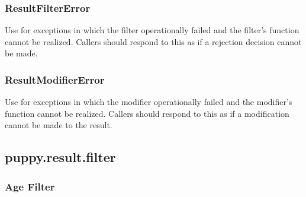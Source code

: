 \documentclass[letterpaper,10pt,english]{sphinxmanual}
\begin{document}
\subsubsection{ResultFilterError}
\label{api3.0:resultfiltererror}

\begin{fulllineitems}
\label{api3.0:puppy.result.exceptions.ResultFilterError}
Use for exceptions in which the filter operationally failed and the
filter's function cannot be realized. Callers should respond to this as if
a rejection decision cannot be made.

\end{fulllineitems}



\subsubsection{ResultModifierError}
\label{api3.0:resultmodifiererror}

\begin{fulllineitems}
\label{api3.0:puppy.result.exceptions.ResultModifierError}
Use for exceptions in which the modifier operationally failed and the
modifier's function cannot be realized. Callers should respond to this as if
a modification cannot be made to the result.

\end{fulllineitems}



\subsection{puppy.result.filter}
\label{api3.0:puppy-result-filter}\label{api3.0:module-puppy.result.filter}

\subsubsection{Age Filter}
\label{api3.0:age-filter}
\end{document}
